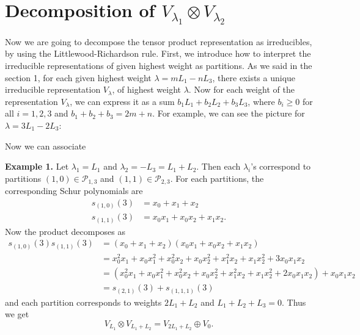 \documentclass{article}
\begin{document}
\section{Decomposition of $V_{\lambda_{1}}\otimes V_{\lambda_{2}}$} 
Now we are going to decompose the tensor product representation as irreducibles, by using the Littlewood-Richardson rule. 
First, we introduce how to interpret the irreducible representations of given highest weight as partitions. 
As we said in the section 1, for each given highest weight $\lambda = mL_{1} - nL_{3}$, there exists a unique irreducible representation $V_{\lambda}$, of highest weight $\lambda$. 
Now for each weight of the representation $V_{\lambda}$, we can express it as a sum $b_{1}L_{1} + b_{2}L_{2} +b_{3}L_{3}$, where $b_{i}\geq 0$ for all $i = 1, 2, 3$ and $b_{1} + b_{2} + b_{3} = 2m+n$. For example, we can see the picture for $\lambda = 3L_{1} - 2L_{3}$:

Now we can associate 

\textbf{Example 1.} Let $\lambda_{1} = L_{1}$ and $\lambda_{2} = -L_{3} = L_{1} + L_{2}$. Then each $\lambda_{i}$'s correspond to partitions $(1, 0)\in \mathcal{P}_{1, 3}$ and $(1, 1)\in \mathcal{P}_{2, 3}$. For each partitions, the corresponding Schur polynomials are
\begin{align*}
s_{(1, 0)}(3) &= x_{0} + x_{1} +x_{2} \\
s_{(1, 1)}(3) &= x_{0}x_{1} + x_{0}x_{2} + x_{1}x_{2}.
\end{align*}
Now the product decomposes as 
\begin{align*}
s_{(1, 0)}(3)s_{(1, 1)}(3) &= (x_{0}+x_{1}+x_{2})(x_{0}x_{1} + x_{0}x_{2} + x_{1}x_{2}) \\
&= x_{0}^{2}x_{1} + x_{0}x_{1}^{2} + x_{0}^{2}x_{2} +x_{0}x_{2}^{2} +x_{1}^{2}x_{2}+x_{1}x_{2}^{2} + 3x_{0}x_{1}x_{2} \\
&= (x_{0}^{2}x_{1} + x_{0}x_{1}^{2} + x_{0}^{2}x_{2} +x_{0}x_{2}^{2} +x_{1}^{2}x_{2}+x_{1}x_{2}^{2} + 2x_{0}x_{1}x_{2}) + x_{0}x_{1}x_{2} \\
&= s_{(2, 1)}(3) + s_{(1, 1, 1)}(3)
\end{align*}
and each partition corresponds to weights $2L_{1} + L_{2}$ and $L_{1} +L_{2} + L_{3} = 0$. 
Thus we get 
$$
V_{L_{1}}\otimes V_{L_{1} + L_{2}} = V_{2L_{1}+L_{2}} \oplus V_{0}. 
$$
\end{document}
